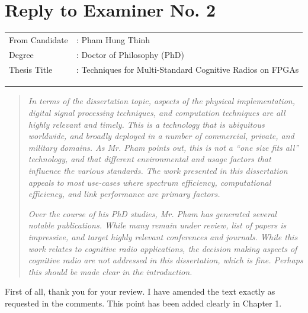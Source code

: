 \documentclass{article}
\begin{document}

\section*{Reply to Examiner No. 2}
\begin{table}[h]
	\begin{tabular}{ll}
		{\large From Candidate} &: {\large  Pham Hung Thinh} \\
		{\large Degree }& : {\large Doctor of Philosophy (PhD)}\\
		{\large Thesis Title }&: {\large Techniques for Multi-Standard Cognitive Radios on FPGAs}\\
		& \\
		& \\
		& 
	\end{tabular}
\end{table}




\begin{quote}
\emph{In terms of the dissertation topic, aspects of the physical implementation, digital signal processing techniques, and computation techniques are all highly relevant and timely. This is a technology that is ubiquitous worldwide, and broadly deployed in a number of commercial, private, and military domains. As Mr. Pham points out, this is not a ``one size fits all'' technology, and that different environmental and usage factors that influence the various standards. The work presented in this dissertation appeals to most use-cases where spectrum efficiency, computational efficiency, and link performance are primary factors.  }
	
\emph{Over the course of his PhD studies, Mr. Pham has generated several notable publications. While many remain under review, list of papers is impressive, and target highly relevant conferences and journals. While this work relates to cognitive radio applications, the decision making aspects of cognitive radio are not addressed in this dissertation, which is fine. Perhaps this should be made clear in the introduction.}
\end{quote}
First of all, thank you for your review. I have amended the text exactly as requested in the comments. This point has been added clearly in Chapter 1.
\end{document}
